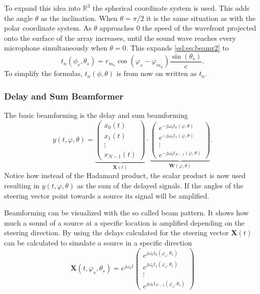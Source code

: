 To expand this idea into $\mathbb{R}^3$ the spherical coordinate system is used.
This adds the angle $\theta$ as the inclination.
When $\theta = \pi/2$ it is the same situation as with the polar coordinate system.
As $\theta$ approaches 0 the speed of the wavefront projected onto the
surface of the array increases, until the sound wave reaches every microphone
simultaneously when $\theta = 0$.
This expands \eqref{ssl:eq:beamr2} to
\begin{equation}
	t_n(\phi_s, \theta_s) =
	r_{m_n} \cos(\varphi_s - \varphi_{m_n})
	\frac{\sin(\theta_s)}{c}.
	\label{ssl:eq:beamr3}
\end{equation}
To simplify the formulas, $t_n(\phi, \theta)$ is from now on written as $t_n$.

\subsubsection{Delay and Sum Beamformer}
The basic beamforming is the delay and sum beamforming
\begin{equation}
	\label{ssl:eq:delAndSum}
	y(t, \varphi, \theta) =
	\underbrace{
		\begin{pmatrix}
			x_0(t) \\
			x_1(t) \\
			\vdots \\
			x_{N-1}(t)
		\end{pmatrix}}_{\bm{X}(t)}
	\cdot
	\underbrace{
		\begin{pmatrix}
			e^{-j\omega_0 t_0(\varphi, \theta)} \\
			e^{-j\omega_0 t_1(\varphi, \theta)} \\
			\vdots                              \\
			e^{-j\omega_0 t_{N-1}(\varphi, \theta)}
		\end{pmatrix}}_{\bm{W}(\varphi, \theta)}.
\end{equation}
Notice how instead of the Hadamard product, the scalar product is now used resulting
in $y(t, \varphi, \theta)$ as the sum of the delayed signals.
If the angles of the steering vector point towards a source its
signal will be amplified.

Beamforming can be visualized with the so called beam pattern.
It shows how much a sound of a source at a specific location
is amplified depending on the steering direction.
By using the delays calculated for the steering vector $\bm{X}(t)$ can
be calculated to simulate a source in a specific direction
\begin{equation}
	\bm{X}(t, \varphi_s, \theta_s) =
	e^{j\omega_0 t}
	\begin{pmatrix}
		e^{j\omega_0 t_0(\varphi_s, \theta_s)} \\
		e^{j\omega_0 t_1(\varphi_s, \theta_s)} \\
		\vdots                                 \\
		e^{j\omega_0 t_{N-1}(\varphi_s, \theta_s)}
	\end{pmatrix}
\end{equation}

